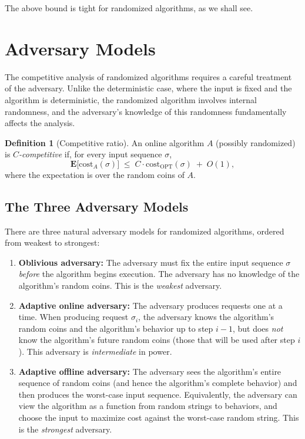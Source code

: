 \documentclass[twoside,12pt]{book}
\theoremstyle{plain}
\theoremstyle{definition}
\newtheorem{definition}[theorem]{Definition}
\theoremstyle{remark}
\begin{document}
The above bound is tight for randomized algorithms, as we shall see.

\section{Adversary Models}
\label{sec:adversary-models}

The competitive analysis of randomized algorithms requires a careful
treatment of the adversary.  Unlike the deterministic case, where the
input is fixed and the algorithm is deterministic, the randomized
algorithm involves internal randomness, and the adversary's knowledge
of this randomness fundamentally affects the analysis.

\begin{definition}[Competitive ratio]
An online algorithm $A$ (possibly randomized) is
\emph{$C$-competitive} if, for every input sequence $\sigma$,
\[
  \mathbf{E}\!\bigl[\mathrm{cost}_A(\sigma)\bigr] \;\le\; C \cdot \mathrm{cost}_{\mathrm{OPT}}(\sigma) \;+\; O(1),
\]
where the expectation is over the random coins of $A$.
\end{definition}

\subsection{The Three Adversary Models}

There are three natural adversary models for randomized algorithms,
ordered from weakest to strongest:

\begin{enumerate}[nosep]
  \item \textbf{Oblivious adversary:} The adversary must fix the entire
        input sequence $\sigma$ \emph{before} the algorithm begins
        execution.  The adversary has no knowledge of the algorithm's
        random coins.  This is the \emph{weakest} adversary.

  \item \textbf{Adaptive online adversary:} The adversary produces
        requests one at a time.  When producing request $\sigma_i$, the
        adversary knows the algorithm's random coins and the algorithm's
        behavior up to step $i-1$, but does \emph{not} know the
        algorithm's future random coins (those that will be used after
        step $i$).  This adversary is \emph{intermediate} in power.

  \item \textbf{Adaptive offline adversary:} The adversary sees the
        algorithm's entire sequence of random coins (and hence the
        algorithm's complete behavior) and then produces the worst-case
        input sequence.  Equivalently, the adversary can view the
        algorithm as a function from random strings to behaviors, and
        choose the input to maximize cost against the worst-case random
        string.  This is the \emph{strongest} adversary.
\end{enumerate}
\end{document}
